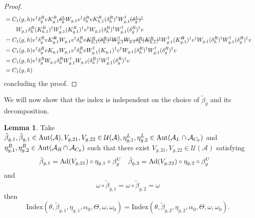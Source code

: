 \documentclass[12pt,a4paper,twoside]{article}
\newcommand{\stkout}[1]{\ifmmode\text{\sout{\ensuremath{#1}}}\else\sout{#1}\fi}
\let\originalleft\left
\let\originalright\right
\renewcommand{\left}{\mathopen{}\mathclose\bgroup\originalleft}
\renewcommand{\right}{\aftergroup\egroup\originalright}
\newcommand{\UU}{\mathcal U}
\renewcommand{\AA}{\mathcal A}
\newcommand{\Ad}[1]{\textrm{Ad}\left(#1\right)}
\newcommand{\Aut}[1]{\textrm{Aut}\left(#1\right)}
\theoremstyle{definition}
\newtheorem{lemma}[theorem]{Lemma}
\numberwithin{equation}{section}
\begin{document}
\begin{proof}
\begin{align}
		&=C_1(g,h)v^\dagger \delta_g^R v K_{g,1}^R \stkout{\delta_g^L} W_{g,1}v^\dagger \delta_h^R v K_{h,1}^R (\delta_h^R)^\dagger W_{g,1}^\dagger \stkout{(\delta_g^L)^\dagger}\\
		\nonumber
		&\qquad  W_{g,1}\delta_h^R (K_{h,1}^R)^\dagger W_{g,1}^\dagger (K_{g,1}^R)^\dagger v^\dagger W_{g,1}(\delta^R_h)^\dagger W_{g,1}^\dagger(\delta_g^R)^\dagger v\\
		&=C_1(g,h)v^\dagger \delta_g^R v K_{g,1}^\stkout{R} W_{g,1}v^\dagger \delta_h^R v \stkout{K_{h,1}^R (\delta_h^R)^\dagger W_{g,1}^\dagger W_{g,1}\delta_h^R (K_{h,1}^R)^\dagger} W_{g,1}^\dagger (K_{g,1}^\stkout{R})^\dagger v^\dagger W_{g,1}(\delta^R_h)^\dagger W_{g,1}^\dagger(\delta_g^R)^\dagger v\\
		&=C_1(g,h)v^\dagger \delta_g^R v K_{g,1} W_{g,1}v^\dagger \delta_h^R v W_{g,1}^\dagger (K_{g,1})^\dagger v^\dagger W_{g,1}(\delta^R_h)^\dagger W_{g,1}^\dagger(\delta_g^R)^\dagger v\\
		&=C_1(g,h)v^\dagger \delta_g^R W_{g,1} \delta_h^R W_{g,1}^\dagger  W_{g,1}(\delta^R_h)^\dagger W_{g,1}^\dagger(\delta_g^R)^\dagger v\\
		&=C_1(g,h)
	\end{align}
	concluding the proof.
\end{proof}
We will now show that the index is independent on the choice of $\tilde{\beta}_g$ and its decomposition.
\begin{lemma}\label{lem:InvarianceUnderChoiceBeta}
	Take $\tilde{\beta}_{g,1},\tilde{\beta}_{g,1}\in\Aut{\AA},V_{g,21},V_{g,22}\in\UU(\AA),\eta_{g,1}^L,\eta_{g,2}^L\in \Aut{\AA_L\cap\AA_{C_\theta}}$ and $\eta_{g,1}^R,\eta_{g,2}^R\in \Aut{\AA_R\cap\AA_{C_\theta}}$ such that there exist $V_{g,21},V_{g,22}\in\UU(\AA)$ satisfying
	\begin{align}
		\tilde{\beta}_{g,1}&=\Ad{V_{g,21}}\circ\eta_{g,1}\circ\beta^U_g&\tilde{\beta}_{g,2}&=\Ad{V_{g,22}}\circ\eta_{g,2}\circ\beta^U_g
	\end{align}
	and
	\begin{equation}
		\omega\circ\tilde{\beta}_{g,1}=\omega\circ\tilde{\beta}_{g,2}=\omega
	\end{equation}
	then
	\begin{equation}
		\textrm{Index}(\theta,\tilde{\beta}_{g,1},\eta_{g,1},\alpha_{0},\Theta,\omega,\omega_0)=\textrm{Index}(\theta,\tilde{\beta}_{g,2},\eta_{g,2},\alpha_{0},\Theta,\omega,\omega_0).
	\end{equation}
\end{lemma}
\end{document}
